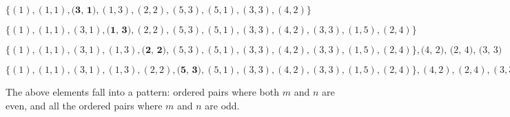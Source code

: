 \documentclass{article}
\begin{document}
$\{(1), (1,1), \textbf{(3, 1)}, (1, 3), (2, 2), (5, 3), (5, 1), (3, 3), (4, 2)\}$

$\{(1), (1,1), (3, 1), \textbf{(1, 3)}, (2, 2), (5, 3), (5, 1), (3, 3), (4, 2), (3, 3), (1,5), (2, 4)\}$

$\{(1), (1,1), (3, 1), (1, 3), \textbf{(2, 2)}, (5, 3), (5, 1), (3, 3), (4, 2), (3, 3), (1,5), (2, 4)\}, \textit{(4, 2), (2, 4), (3, 3)}$

$\{(1), (1,1), (3, 1), (1, 3), (2, 2), \textbf{(5, 3)}, (5, 1), (3, 3), (4, 2), (3, 3), (1,5), (2, 4)\}, (4, 2), (2, 4), (3, 3), \textit{(7, 3), (5, 5), (6, 4)}$

The above elements fall into a pattern: ordered pairs where both $m$ and $n$ are even, and all the ordered pairs where $m$ and $n$ are odd.
\end{document}
